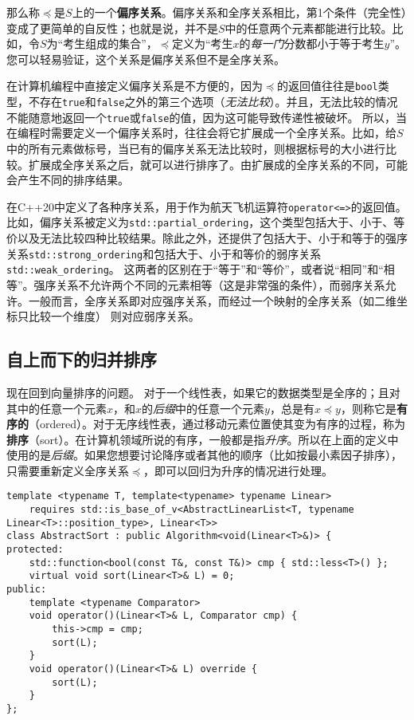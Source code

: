 那么称$\preceq$是$S$上的一个\textbf{偏序关系}。偏序关系和全序关系相比，第1个条件（完全性）变成了更简单的自反性；也就是说，并不是$S$中的任意两个元素都能进行比较。比如，令$S$为“考生组成的集合”，$\preceq$定义为“考生$x$的\textit{每一门}分数都小于等于考生$y$”。您可以轻易验证，这个关系是偏序关系但不是全序关系。

在计算机编程中直接定义偏序关系是不方便的，因为$\preceq$的返回值往往是\lstinline{bool}类型，不存在\lstinline{true}和\lstinline{false}之外的第三个选项（\textit{无法比较}）。并且，无法比较的情况不能随意地返回一个\lstinline{true}或\lstinline{false}的值，因为这可能导致传递性被破坏。
所以，当在编程时需要定义一个偏序关系时，往往会将它扩展成一个全序关系。比如，给$S$中的所有元素做标号，当已有的偏序关系无法比较时，则根据标号的大小进行比较。扩展成全序关系之后，就可以进行排序了。由扩展成的全序关系的不同，可能会产生不同的排序结果。

在C++20中定义了各种序关系，用于作为航天飞机运算符\lstinline{operator<=>}的返回值。比如，偏序关系被定义为\lstinline{std::partial_ordering}，这个类型包括大于、小于、等价以及无法比较四种比较结果。除此之外，还提供了包括大于、小于和等于的强序关系\lstinline{std::strong_ordering}和包括大于、小于和等价的弱序关系\lstinline{std::weak_ordering}。
这两者的区别在于“等于”和“等价”，或者说“相同”和“相等”。强序关系不允许两个不同的元素相等（这是非常强的条件），而弱序关系允许。一般而言，全序关系即对应强序关系，而经过一个映射的全序关系（如二维坐标只比较一个维度） 则对应弱序关系。

\subsection{自上而下的归并排序}
\label{sec:归并排序}
现在回到向量排序的问题。
对于一个线性表，如果它的数据类型是全序的；且对其中的任意一个元素$x$，和$x$的\textit{后缀}中的任意一个元素$y$，总是有$x\preceq y$，则称它是\textbf{有序的}（ordered）。对于无序线性表，通过移动元素位置使其变为有序的过程，称为\textbf{排序}（sort）。在计算机领域所说的有序，一般都是指\textit{升序}。所以在上面的定义中使用的是\textit{后缀}。如果您想要讨论降序或者其他的顺序（比如按最小素因子排序），只需要重新定义全序关系$\preceq$，即可以回归为升序的情况进行处理。

\begin{lstlisting}
template <typename T, template<typename> typename Linear>
    requires std::is_base_of_v<AbstractLinearList<T, typename Linear<T>::position_type>, Linear<T>>
class AbstractSort : public Algorithm<void(Linear<T>&)> {
protected:
    std::function<bool(const T&, const T&)> cmp { std::less<T>() };
    virtual void sort(Linear<T>& L) = 0;
public:
    template <typename Comparator>
    void operator()(Linear<T>& L, Comparator cmp) {
        this->cmp = cmp;
        sort(L);
    }
    void operator()(Linear<T>& L) override {
        sort(L);
    }
};
\end{lstlisting}

